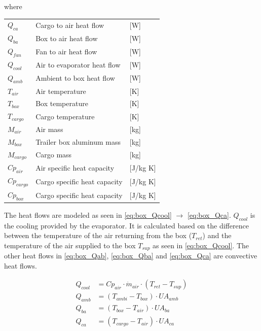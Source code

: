 where
\begin{center}
	\begin{tabular}{l p{8cm} l}
		$Q_{ca}$     & Cargo to air heat flow       & [\si{W}]                \\
		$Q_{ba}$     & Box to air heat flow         & [\si{W}]                \\
		$Q_{fan}$    & Fan to air heat flow         & [\si{W}]                \\
		$Q_{cool}$   & Air to evaporator heat flow  & [\si{W}]                \\
		$Q_{amb}$    & Ambient to box heat flow     & [\si{W}]                \\
		$T_{air}$    & Air temperature              & [\si{K}]                \\
		$T_{box}$    & Box temperature              & [\si{K}]                \\
		$T_{cargo}$  & Cargo temperature            & [\si{K}]                \\
		$M_{air}$    & Air mass                     & [\si{kg}]               \\
		$M_{box}$    & Trailer box aluminum mass    & [\si{kg}]               \\
		$M_{cargo}$  & Cargo mass                   & [\si{kg}]               \\
		$Cp_{air}$   & Air specific heat capacity   & [\si{J}/\si{kg} \si{K}] \\
		$Cp_{cargo}$ & Cargo specific heat capacity & [\si{J}/\si{kg} \si{K}] \\
		$Cp_{box}$   & Cargo specific heat capacity & [\si{J}/\si{kg} \si{K}]
	\end{tabular}
\end{center}


The heat flows are modeled as seen in \cref{eq:box_Qcool} $\rightarrow$ \cref{eq:box_Qca}. $Q_{cool}$ is the cooling provided by the evaporator. It is calculated based on the difference between the temperature of the air returning from the box ($T_{ret}$) and the temperature of the air supplied to the box $T_{sup}$ as seen in \cref{eq:box_Qcool}. The other heat flows in \cref{eq:box_Qab}, \cref{eq:box_Qba} and \cref{eq:box_Qca} are convective heat flows.


\begin{align}
	Q_{cool}   & = Cp_{air} \cdot \dot{m}_{air} \cdot (T_{ret} - T_{sup})	\label{eq:box_Qcool} \\
	Q_{amb}    & = (T_{ambi} - T_{box}) \cdot U A_{amb}						\label{eq:box_Qab}   \\
	Q_{ba}     & = (T_{box} - T_{air}) \cdot U A_{ba}						\label{eq:box_Qba}   \\
	Q_{ca}     & = (T_{cargo} - T_{air}) \cdot U A_{ca}                  	\label{eq:box_Qca}
\end{align}

